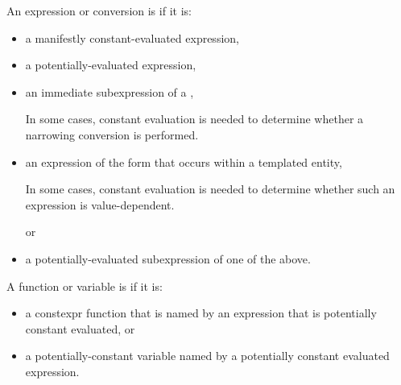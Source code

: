 \pnum
{}%
An expression or conversion is 
if it is:
\begin{itemize}
\item
a manifestly constant-evaluated expression,

\item
a potentially-evaluated expression,

\item
an immediate subexpression of a ,
\begin{footnote}
In some cases, constant evaluation is needed to determine whether a narrowing conversion is performed.
\end{footnote}

\item
an expression of the form \tcode{\&} 
that occurs within a templated entity,
\begin{footnote}
In some cases, constant evaluation is needed to determine whether such an expression is value-dependent.
\end{footnote}
or

\item
a potentially-evaluated subexpression of one of the above.
\end{itemize}

%
%
A function or variable is
if it is:
\begin{itemize}
\item
a constexpr function that is named by an expression
that is potentially constant evaluated, or

\item
a potentially-constant variable named by a potentially constant evaluated expression.
\end{itemize}


